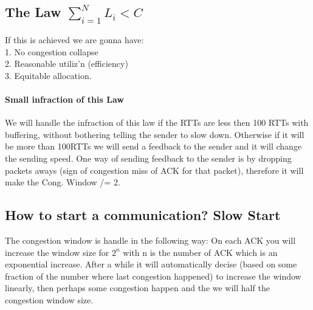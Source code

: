 \documentclass{article}
\begin{document}
          \subsection{The Law $\sum_{i=1}^{N} L_i < C$}
            If this is achieved we are gonna have: \\ 1. No congestion collapse \\ 2. Reasonable
            utiliz'n (efficiency) \\ 3. Equitable allocation.
            \paragraph{Small infraction of this Law} We will handle the infraction of this law
              if the RTTs are less then 100 RTTs with buffering, without bothering telling the
              sender to slow down. Otherwise if it will be more than 100RTTs we will send a 
              feedback to the sender and it will change the sending speed. One way of sending
              feedback to the sender is by dropping packets aways (sign of congestion miss of 
              ACK for that packet), therefore it will make the Cong. Window /= 2.
    \subsection{How to start a communication? Slow Start}
      The congestion window is handle in the following way: On each ACK you will increase 
      the window size for $2^n$ with n is the number of ACK which is an exponential increase.
      After a while it will automatically decise (based on some fraction of the number where
      last congestion happened) to increase the window linearly, then perhaps some congestion 
      happen and the we will half the congestion window size.
\end{document}
